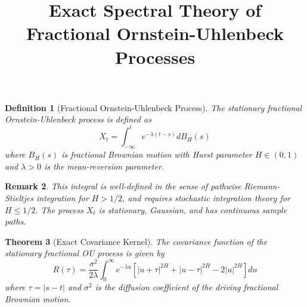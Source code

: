 \documentclass[12pt]{article}
\title{Exact Spectral Theory of Fractional Ornstein-Uhlenbeck Processes}
\author{}
\date{}
\newtheorem{theorem}{Theorem}
\newtheorem{definition}[theorem]{Definition}
\newtheorem{remark}[theorem]{Remark}
\begin{document}
\maketitle

\begin{definition}[Fractional Ornstein-Uhlenbeck Process]
The stationary fractional Ornstein-Uhlenbeck process is defined as
\begin{equation}
X_t = \int_{-\infty}^t e^{-\lambda(t-s)} dB_H(s)
\end{equation}
where $B_H(s)$ is fractional Brownian motion with Hurst parameter $H \in (0,1)$ and $\lambda > 0$ is the mean-reversion parameter.
\end{definition}

\begin{remark}
This integral is well-defined in the sense of pathwise Riemann-Stieltjes integration for $H > 1/2$, and requires stochastic integration theory for $H \leq 1/2$. The process $X_t$ is stationary, Gaussian, and has continuous sample paths.
\end{remark}

\begin{theorem}[Exact Covariance Kernel]
The covariance function of the stationary fractional OU process is given by
\begin{equation}
R(\tau) = \frac{\sigma^2}{2\lambda} \int_0^\infty e^{-\lambda u} \left[|u+\tau|^{2H} + |u-\tau|^{2H} - 2|u|^{2H}\right] du
\end{equation}
where $\tau = |s-t|$ and $\sigma^2$ is the diffusion coefficient of the driving fractional Brownian motion.
\end{theorem}
\end{document}
